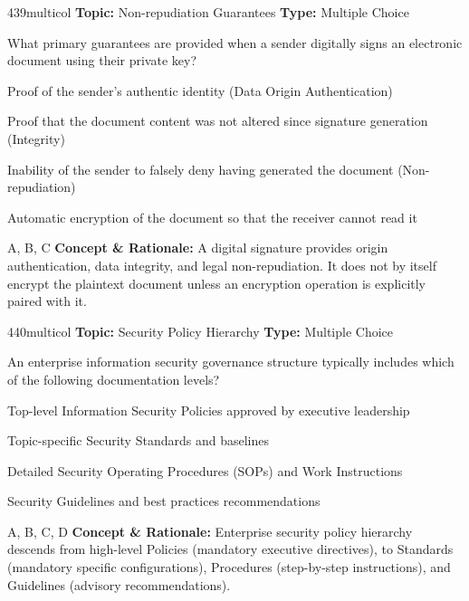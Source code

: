 \begin{qcard}{439}{multicol}
\textcolor{darkslate!75}{\small\textbf{Topic:} Non-repudiation Guarantees \hfill \textbf{Type:} Multiple Choice}\vspace{0.4em}\par
What primary guarantees are provided when a sender digitally signs an electronic document using their private key?
\begin{qoptions}
\item Proof of the sender's authentic identity (Data Origin Authentication)
\item Proof that the document content was not altered since signature generation (Integrity)
\item Inability of the sender to falsely deny having generated the document (Non-repudiation)
\item Automatic encryption of the document so that the receiver cannot read it
\end{qoptions}
\end{qcard}
\nopagebreak
\begin{explainbox}{A, B, C}
\textbf{Concept \& Rationale:} A digital signature provides origin authentication, data integrity, and legal non-repudiation. It does not by itself encrypt the plaintext document unless an encryption operation is explicitly paired with it.
\end{explainbox}

\begin{qcard}{440}{multicol}
\textcolor{darkslate!75}{\small\textbf{Topic:} Security Policy Hierarchy \hfill \textbf{Type:} Multiple Choice}\vspace{0.4em}\par
An enterprise information security governance structure typically includes which of the following documentation levels?
\begin{qoptions}
\item Top-level Information Security Policies approved by executive leadership
\item Topic-specific Security Standards and baselines
\item Detailed Security Operating Procedures (SOPs) and Work Instructions
\item Security Guidelines and best practices recommendations
\end{qoptions}
\end{qcard}
\nopagebreak
\begin{explainbox}{A, B, C, D}
\textbf{Concept \& Rationale:} Enterprise security policy hierarchy descends from high-level Policies (mandatory executive directives), to Standards (mandatory specific configurations), Procedures (step-by-step instructions), and Guidelines (advisory recommendations).
\end{explainbox}

